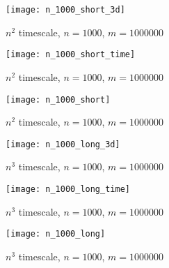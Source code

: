\documentclass[11pt]{article}
\begin{document}
\begin{changemargin}{0.0cm}{0.0cm}
\begin{figure}[h!]
  \centering
  \texttt{[image: n\_1000\_short\_3d]}
  \caption{$n^{2}$ timescale, $n=1000$, $m=1000000$}
  \label{fig:1000s3}
\end{figure}
\begin{figure}[h!]
  \centering
  \texttt{[image: n\_1000\_short\_time]}
  \caption{$n^{2}$ timescale, $n=1000$, $m=1000000$}
  \label{fig:1000st}
\end{figure}
\begin{figure}[h!]
  \centering
  \texttt{[image: n\_1000\_short]}
  \caption{$n^{2}$ timescale, $n=1000$, $m=1000000$}
  \label{fig:1000sv}
\end{figure}
\begin{figure}[h!]
  \centering
  \texttt{[image: n\_1000\_long\_3d]}
  \caption{$n^{3}$ timescale, $n=1000$, $m=1000000$}
  \label{fig:1000l3}
\end{figure}
\begin{figure}[h!]
  \centering
  \texttt{[image: n\_1000\_long\_time]}
  \caption{$n^{3}$ timescale, $n=1000$, $m=1000000$}
  \label{fig:1000lt}
\end{figure}
\begin{figure}[h!]
  \centering
  \texttt{[image: n\_1000\_long]}
  \caption{$n^{3}$ timescale, $n=1000$, $m=1000000$}
  \label{fig:1000lv}
\end{figure}
\end{changemargin}
\end{document}
